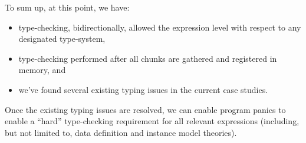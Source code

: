 To sum up, at this point, we have:

\begin{itemize}
      \item type-checking, bidirectionally, allowed the expression level with
            respect to any designated type-system,
      \item type-checking performed after all chunks are gathered and registered
            in memory, and
      \item we've found several existing typing issues in the current case
            studies.
\end{itemize}

Once the existing typing issues are resolved, we can enable program panics to
enable a ``hard'' type-checking requirement for all relevant expressions
(including, but not limited to, data definition and instance model theories).

